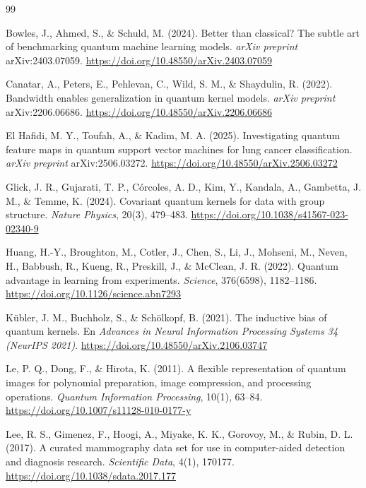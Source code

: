 \begin{thebibliography}{99}

    Bowles, J., Ahmed, S., \& Schuld, M. (2024).
    Better than classical? The subtle art of benchmarking quantum machine learning models.
    \textit{arXiv preprint} arXiv:2403.07059.
    \url{https://doi.org/10.48550/arXiv.2403.07059}

    Canatar, A., Peters, E., Pehlevan, C., Wild, S. M., \& Shaydulin, R. (2022).
    Bandwidth enables generalization in quantum kernel models.
    \textit{arXiv preprint} arXiv:2206.06686.
    \url{https://doi.org/10.48550/arXiv.2206.06686}

    El Hafidi, M. Y., Toufah, A., \& Kadim, M. A. (2025).
    Investigating quantum feature maps in quantum support vector machines for lung cancer classification.
    \textit{arXiv preprint} arXiv:2506.03272.
    \url{https://doi.org/10.48550/arXiv.2506.03272}

    Glick, J. R., Gujarati, T. P., C{\'{o}}rcoles, A. D., Kim, Y., Kandala, A., Gambetta, J. M., \& Temme, K. (2024).
    Covariant quantum kernels for data with group structure.
    \textit{Nature Physics}, 20(3), 479--483.
    \url{https://doi.org/10.1038/s41567-023-02340-9}

    Huang, H.-Y., Broughton, M., Cotler, J., Chen, S., Li, J., Mohseni, M., Neven, H., Babbush, R., Kueng, R., Preskill, J., \& McClean, J. R. (2022).
    Quantum advantage in learning from experiments.
    \textit{Science}, 376(6598), 1182--1186.
    \url{https://doi.org/10.1126/science.abn7293}

    K\"ubler, J. M., Buchholz, S., \& Sch\"olkopf, B. (2021).
    The inductive bias of quantum kernels.
    En \textit{Advances in Neural Information Processing Systems 34 (NeurIPS 2021)}.
    \url{https://doi.org/10.48550/arXiv.2106.03747}

    Le, P. Q., Dong, F., \& Hirota, K. (2011).
    A flexible representation of quantum images for polynomial preparation, image compression, and processing operations.
    \textit{Quantum Information Processing}, 10(1), 63--84.
    \url{https://doi.org/10.1007/s11128-010-0177-y}

    Lee, R. S., Gimenez, F., Hoogi, A., Miyake, K. K., Gorovoy, M., \& Rubin, D. L. (2017).
    A curated mammography data set for use in computer-aided detection and diagnosis research.
    \textit{Scientific Data}, 4(1), 170177.
    \url{https://doi.org/10.1038/sdata.2017.177}


\end{thebibliography}

